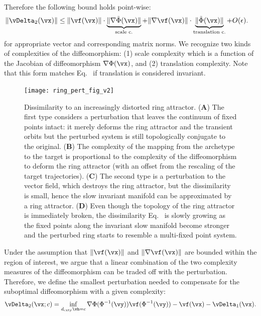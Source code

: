 \documentclass{article}
\theoremstyle{definition} \newtheorem{definition}{Definition}  \newtheorem{example}{Example}
\theoremstyle{remark} \newtheorem{remark}{Remark}
\renewcommand{\eqref}{Eq.~\originaleqref}
\newcounter{ct}
\DeclarePairedDelimiter{\norm}{\lVert}{\rVert}
\newcommand{\inv}{^{-1}}
\newcommand{\dcomplexity}{\ensuremath{d_\text{cxty}}}
\newcommand{\homeo}{\Phi} %
\newcommand{\invhomeo}{\homeo\inv}
\begin{document}
Therefore the following bound holds point-wise:
\begin{align}
    \norm{\vDelta_2(\vx)}
    &\leq
	\norm{\vf(\vx)}
	\cdot
	\underbrace{
	    \norm{\nabla\tilde\homeo(\vx)}
	}_{\substack{\text{scale c.}}}
	+
	\norm{\nabla\vf(\vx)}
	\cdot
	\underbrace{
	\norm{\tilde\homeo(\vx)}
	}_{\substack{\text{translation c.}}}
	+ O(\epsilon).
    \label{eq:h:bound}
\end{align}
for appropriate vector and corresponding matrix norms.
We recognize two kinds of complexities of the diffeomorphism: (1) scale complexity which is a function of the Jacobian of diffeomorphism $\nabla\homeo(\vx)$, and (2) translation complexity.
Note that this form matches \eqref{eq:dcomplexity} if translation is considered invariant.

\begin{figure}[t!bhp]
    \centering
    \texttt{[image: ring\_pert\_fig\_v2]}
    \caption{Dissimilarity to an increasingly distorted ring attractor. %
    (\textbf{A}) The first type considers a perturbation that leaves the continuum of fixed points intact: it merely deforms the ring attractor and the transient orbits but the perturbed system is still topologically conjugate to the original. 
    (\textbf{B}) The complexity of the mapping from the archetype to the target is proportional to the complexity of the diffeomorphism to deform the ring attractor (with an offset from the rescaling of the target trajectories).
    (\textbf{C}) The second type is a perturbation to the vector field, which destroys the ring attractor, but the dissimilarity is small, hence the slow invariant manifold can be approximated by a ring attractor.
    (\textbf{D}) Even though the topology of the ring attractor is immediately broken, the dissimilarity \eqref{eq:loss} is slowly growing as the fixed points along the invariant slow manifold become stronger and the perturbed ring starts to resemble a multi-fixed point system.
    }
    \label{fig:ring_pert_fig}
\end{figure}

Under the assumption that $\norm{\vf(\vx)}$ and $\norm{\nabla\vf(\vx)}$ are bounded within the region of interest, we argue that a linear combination of the two complexity measures of the diffeomorphism can be traded off with the perturbation.
Therefore, we define the smallest perturbation needed to compensate for the suboptimal diffeomorphism with a given complexity:
\begin{align}
    \vDelta_2(\vx ; c) = \inf_{\dcomplexity{\vh} = c}
	\nabla\homeo(\invhomeo(\vy)) \vf(\invhomeo(\vy))
	- \vf(\vx) - \vDelta_1(\vx).
\end{align}
\end{document}
